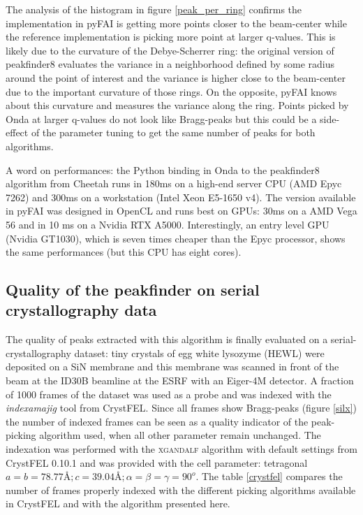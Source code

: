 \documentclass[preprint]{iucr}              %
\begin{document}
The analysis of the histogram in figure \ref{peak_per_ring} confirms the implementation in pyFAI is getting more points closer to the beam-center while the reference implementation is picking more point at larger q-values.
This is likely due to the curvature of the Debye-Scherrer ring: the original version of peakfinder8 evaluates the variance in a neighborhood defined by some radius around the point of interest and the variance is higher close to the beam-center due to the important curvature of those rings.
On the opposite, pyFAI knows about this curvature and measures the variance along the ring.
Points picked by Onda at larger q-values do not look like Bragg-peaks but this could be a side-effect of the parameter tuning to get the same number of peaks for both algorithms.

A word on performances: the Python binding in Onda to the peakfinder8 algorithm from Cheetah runs in 180ms on a high-end server CPU (AMD Epyc 7262) and 300ms on a workstation (Intel Xeon E5-1650 v4). 
The version available in pyFAI was designed in OpenCL \cite{opencl_khronos, opencl, pyopencl} and runs best on GPUs: 30ms on a AMD Vega 56 and in 10 ms on a Nvidia RTX A5000. 
Interestingly, an entry level GPU (Nvidia GT1030), which is seven times cheaper than the Epyc processor, shows the same performances (but this CPU has eight cores).

\subsection{Quality of the peakfinder on serial crystallography data}

The quality of peaks extracted with this algorithm is finally evaluated on a serial-crystallography dataset: tiny crystals of egg white lysozyme (HEWL) were deposited on a SiN membrane and this membrane was scanned in front of the beam at the ID30B beamline at the ESRF with an Eiger-4M detector.
A fraction of 1000 frames of the dataset \cite{ssx-Lyso} was used as a probe and was indexed with the \textit{indexamajig} tool from CrystFEL. 
Since all frames show Bragg-peaks (figure \ref{silx}) the number of indexed frames can be seen as a quality indicator of the peak-picking algorithm used, when all other parameter remain unchanged.
The indexation was performed with the \textsc{xgandalf} algorithm \cite{xgandalf} with default settings from CrystFEL 0.10.1 and was provided with the cell parameter: tetragonal $a=b=78.77\text{\AA}; c=39.04\text{\AA}; \alpha=\beta=\gamma = 90^o$.
The table \ref{crystfel} compares the number of frames properly indexed with the different picking algorithms available in CrystFEL and with the algorithm presented here. 
\end{document}
